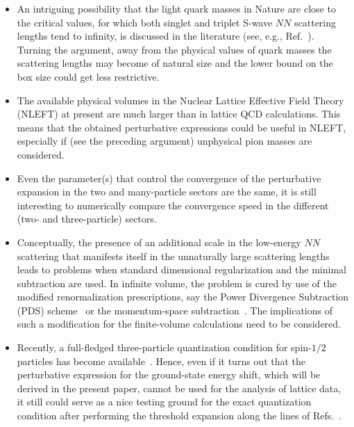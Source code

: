 \documentclass[12pt,prd,tightenlines,nofootinbib]{revtex4-2}
\begin{document}
\begin{itemize}

\item
  An intriguing possibility that the light quark masses in Nature
  are close to the critical values, for
  which both singlet and triplet S-wave $NN$ scattering lengths tend to infinity,
  is discussed in the literature (see, e.g., Ref.~\cite{Epelbaum:2008ga}). Turning the
  argument, away from the physical values of quark masses the scattering lengths may
  become of natural size and the lower bound on the box size could get less restrictive.

\item
\begin{sloppypar}
  The available physical volumes in the Nuclear Lattice Effective Field Theory
  (NLEFT) \cite{Lahde:2019npb} at present are much larger than in lattice QCD calculations. This means that the obtained perturbative expressions could be useful in NLEFT, especially if (see the preceding argument) unphysical pion masses are considered.
\end{sloppypar}





\item
  Even the parameter(s) that control 
the convergence of the perturbative expansion in the
two and many-particle sectors are the same, it is still interesting to numerically compare
the convergence speed in the different (two- and three-particle) sectors.



\item
  Conceptually, the presence of an additional scale in the low-energy $NN$ scattering that
  manifests itself in the unnaturally large scattering lengths leads to problems when
  standard dimensional regularization and the minimal subtraction are used. In
  infinite volume, the problem is cured by use of the modified renormalization
  prescriptions, say the Power Divergence Subtraction (PDS)
  scheme~\cite{Kaplan:1996xu,Kaplan:1998tg,Kaplan:1998we} or
  the momentum-space subtraction~\cite{Gegelia:1998gn}. The implications of such
  a modification for the finite-volume calculations need to be considered.
  



\item
  Recently, a full-fledged
  three-particle quantization condition for spin-$1/2$ particles
has become available~\cite{Draper:2023xvu}.
  Hence, even if it turns out that the
  perturbative expression for the ground-state energy shift, which will be derived
  in the present
  paper, cannot be used for the analysis of lattice data, it still
  could serve as a nice testing ground for
the exact
quantization condition after performing the threshold expansion
along the lines of Refs.~\cite{Hansen:2016fzj,Pang:2019dfe}.

\end{itemize}
\end{document}
